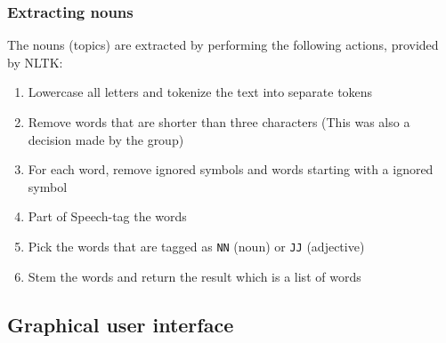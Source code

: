 \subsubsection{Extracting nouns}

The nouns (topics) are extracted by performing the following actions, provided
by NLTK:

\begin{enumerate}
    \item Lowercase all letters and tokenize the text into separate tokens
    \item Remove words that are shorter than three characters (This was also a
          decision made by the group)
    \item For each word, remove ignored symbols and words starting with a
	    ignored symbol
    \item Part of Speech-tag \cite{pos} the words
    \item Pick the words that are tagged as \texttt{NN} (noun) or \texttt{JJ}
        (adjective)
    \item Stem the words and return the result which is a list of words
\end{enumerate}








\subsection{Graphical user interface}
